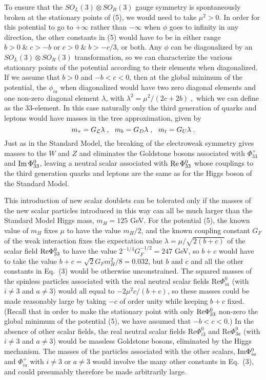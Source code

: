 To ensure that the  $SO_L(3)\otimes  SO_R(3)$ gauge symmetry is spontaneously broken at the stationary points of (5), we would need to take $\mu^2>0$.  In order for this potential to go to $+\infty$ rather than $-\infty$ when $\phi$ goes to infinity in any direction, the other constants in (5) would have to be in either range $
b>0\;\&\;c>-b$ or $c>0\;\&\; b>-c/3$,
or both.
Any $\phi$ can be diagonalized by an $SO_L(3)\otimes  SO_R(3)$ transformation, so we can characterize the various 
stationary points of the potential according to their  elements when diagonalized.  If we assume that $b>0$ and $-b<c<0$, then at the global minimum of the potential, the 
$\phi_{ia}$  when diagonalized would have two zero diagonal elements and one non-zero diagonal element $\lambda$,  with $ \lambda^2 =
 \mu^2/(2c+2b)\;,$ 
which we can define as the 33-element.  In this case naturally only the third generation of quarks and leptons would have masses in the tree approximation, given by
\begin{equation}
m_\tau=G_{\cal L}  \lambda\;,~~m_b=G_D  \lambda\;,~~m_t=G_U  \lambda\;.
\end{equation}
Just as in the Standard Model, the breaking of the electroweak symmetry gives masses to the $W$ and $Z$ and eliminates the Goldstone bosons associated with $\Phi^+_{33}$ 
and ${\rm Im}\,\Phi^0_{33}$, leaving a neutral scalar associated with 
${\rm Re}\,\Phi^0_{33}$ whose couplings to the third generation quarks and leptons are the same as for the Higgs boson of the Standard Model.  

This introduction of  new scalar doublets can be tolerated only if the masses of the new scalar particles introduced in this way can all be much larger than the Standard Model Higgs mass, $m_H=125$ GeV.  For the potential (5), the known value of $m_H$  fixes $\mu$  to have the value $m_H/2$, and the known coupling constant 
$G_F$ of the weak interaction fixes the expectation value $\lambda=\mu/\sqrt{2(b+c)}$ of the scalar field ${\rm Re}\Phi^0_{33}$ to have the value $2^{-1/4}G_F^{-1/2}=247$ GeV, so  $b+c$ would have to take  the value $b+c=\sqrt{2}G_Fm_H^2/8=0.032$, but $b$ and $c$ and all the other constants in Eq.~(3) would be otherwise unconstrained.  The squared masses of the spinless particles  associated with the real neutral scalar fields  Re$\Phi_{ia}^0$ (with $i\neq 3$ and $a\neq 3$) would all equal to  $-2\mu^2 c/(b+c)$, so these masses could be made reasonably large by taking $-c$ of order unity while keeping $b+c$ fixed.    (Recall that in order to make the stationary point with only ${\rm Re}\Phi^0_{33}$ non-zero the global minimum of the potential (5), we have assumed that $-b<c<0$.) In the absence of other scalar fields, the real neutral scalar fields  Re$\Phi_{i3}^0$ and Re$\Phi_{3a}^0$ (with $i\neq 3$ and $a\neq 3$) would be massless Goldstone bosons,  eliminated by the Higgs mechanism.    The masses of  the particles associated with the other scalars, ${\rm Im}\Phi^0_{ia}$ and $\Phi^+_{ia}$ with $i\neq 3$ or $a\neq 3$ would involve the many other constants in Eq.~(3), and could  presumably therefore be made arbitrarily large.    

